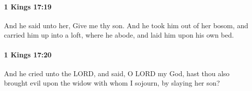 		\paragraph{1 Kings 17:19} %
			\label{1KINGS-17-19}

			And he said unto her, Give me thy son. And he took him out of her bosom, and carried him up into a loft, where he abode, and laid him upon his own bed.


		\paragraph{1 Kings 17:20} %
			\label{1KINGS-17-20}

			And he cried unto the LORD, and said, O LORD my God, hast thou also brought evil upon the widow with whom I sojourn, by slaying her son?



